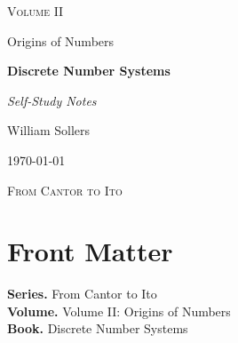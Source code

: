 \documentclass[12pt, a4paper]{report}
\begin{document}
\ExplSyntaxOff
\renewcommand{\familydefault}{\rmdefault}

\begin{titlepage}
\centering
\vspace*{3.5cm}

{\Large\scshape Volume II\par}
\vspace{0.35cm}
{\large Origins of Numbers\par}

\vspace{1.4cm}

{\Huge\bfseries Discrete Number Systems\par}

\vspace{0.6cm}
{\large\itshape Self-Study Notes\par}

\vfill

{\large William Sollers\par}
\vspace{0.35cm}
{\large \today\par}

\vfill

{\large\scshape From Cantor to Ito\par}
\end{titlepage}

\clearpage
\thispagestyle{plain}
\chapter*{Front Matter}
\noindent\textbf{Series.} From Cantor to Ito\\[0.5em]
\textbf{Volume.} Volume II: Origins of Numbers\\[0.5em]
\textbf{Book.} Discrete Number Systems

\clearpage
\tableofcontents
\clearpage
{}



\clearpage



\printindex[tech]
\printindex[dep]
\end{document}
